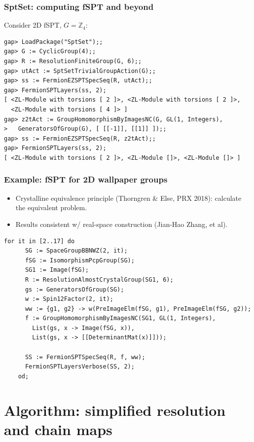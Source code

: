 \documentclass[xcolor=table, aspectratio=169]{beamer}
\begin{document}
\begin{frame}[fragile]
	\frametitle{SptSet: computing fSPT and beyond}
	Consider 2D fSPT, $G=\mathbb Z_4$:
\begin{lstlisting}[basicstyle=\footnotesize]
gap> LoadPackage("SptSet");;
gap> G := CyclicGroup(4);;
gap> R := ResolutionFiniteGroup(G, 6);;
gap> utAct := SptSetTrivialGroupAction(G);;
gap> ss := FermionEZSPTSpecSeq(R, utAct);;
gap> FermionSPTLayers(ss, 2);
[ <ZL-Module with torsions [ 2 ]>, <ZL-Module with torsions [ 2 ]>,
  <ZL-Module with torsions [ 4 ]> ]
gap> z2tAct := GroupHomomorphismByImagesNC(G, GL(1, Integers),
>   GeneratorsOfGroup(G), [ [[-1]], [[1]] ]);;
gap> ss := FermionEZSPTSpecSeq(R, z2tAct);;
gap> FermionSPTLayers(ss, 2);
[ <ZL-Module with torsions [ 2 ]>, <ZL-Module []>, <ZL-Module []> ]
\end{lstlisting}

\end{frame}

\begin{frame}[fragile]
  \frametitle{Example: fSPT for 2D wallpaper groups}
  \begin{itemize}
  \item Crystalline equivalence principle (Thorngren \& Else, PRX 2018): calculate the equivalent problem.
  \item Results consistent w/ real-space construction (Jian-Hao Zhang, et al).
  \end{itemize}
  \begin{lstlisting}[basicstyle=\footnotesize]
    for it in [2..17] do
      SG := SpaceGroupBBNWZ(2, it);
      fSG := IsomorphismPcpGroup(SG);
      SG1 := Image(fSG);
      R := ResolutionAlmostCrystalGroup(SG1, 6);
      gs := GeneratorsOfGroup(SG);
      w := Spin12Factor(2, it);
      ww := {g1, g2} -> w(PreImageElm(fSG, g1), PreImageElm(fSG, g2));
      f := GroupHomomorphismByImagesNC(SG1, GL(1, Integers),
        List(gs, x -> Image(fSG, x)),
        List(gs, x -> [[DeterminantMat(x)]]));

      SS := FermionSPTSpecSeq(R, f, ww);
      FermionSPTLayersVerbose(SS, 2);
    od;
  \end{lstlisting}
\end{frame}

\section{Algorithm: simplified resolution and chain maps}
\end{document}
